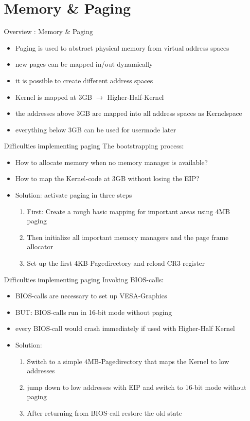 \section{Memory \& Paging}

\begin{frame}{Overview : Memory \& Paging}
\begin{itemize}
	\item Paging is used to abstract physical memory from virtual address spaces
	\item new pages can be mapped in/out dynamically
	\item it is possible to create different address spaces
	\item Kernel is mapped at 3GB $\rightarrow$ Higher-Half-Kernel
	\item the addresses above 3GB are mapped into all address spaces as Kernelspace
	\item everything below 3GB can be used for usermode later
\end{itemize}	
\end{frame}

\begin{frame}{Difficulties implementing paging}
The bootstrapping process:
\begin{itemize}
\item How to allocate memory when no memory manager is available?
\item How to map the Kernel-code at 3GB without losing the EIP?
\item Solution: activate paging in three steps
\begin{enumerate}
	\item First: Create a rough basic mapping for important areas using 4MB paging
	\item Then initialize all important memory managers and the page frame allocator
	\item Set up the first 4KB-Pagedirectory and reload CR3 register
\end{enumerate}
\end{itemize}	
\end{frame}

\begin{frame}{Difficulties implementing paging}
Invoking BIOS-calls:
\begin{itemize}
\item BIOS-calls are necessary to set up VESA-Graphics
\item BUT: BIOS-calls run in 16-bit mode without paging
\item every BIOS-call would crash immediately if used with Higher-Half Kernel
\item Solution:
\begin{enumerate}
\item Switch to a simple 4MB-Pagedirectory that maps the Kernel to low addresses
\item jump down to low addresses with EIP and switch to 16-bit mode without paging
\item After returning from BIOS-call restore the old state
\end{enumerate}
\end{itemize}	
\end{frame}